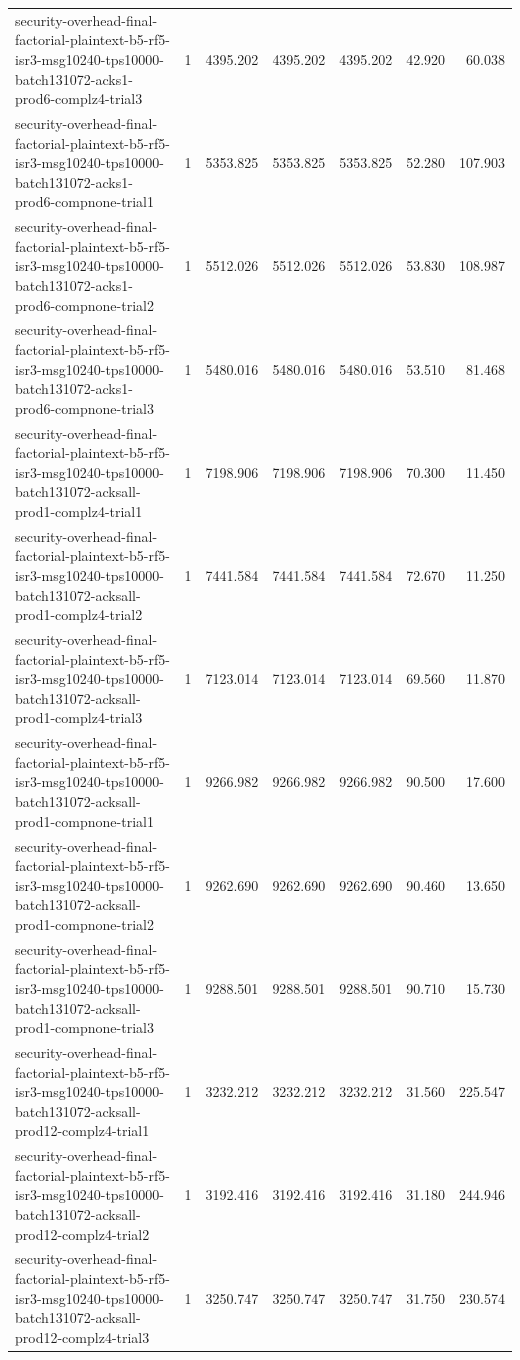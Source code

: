 \begin{tabular}{lrrrrrr}
security-overhead-final-factorial-plaintext-b5-rf5-isr3-msg10240-tps10000-batch131072-acks1-prod6-complz4-trial3 & 1 & 4395.202 & 4395.202 & 4395.202 & 42.920 & 60.038 \\
security-overhead-final-factorial-plaintext-b5-rf5-isr3-msg10240-tps10000-batch131072-acks1-prod6-compnone-trial1 & 1 & 5353.825 & 5353.825 & 5353.825 & 52.280 & 107.903 \\
security-overhead-final-factorial-plaintext-b5-rf5-isr3-msg10240-tps10000-batch131072-acks1-prod6-compnone-trial2 & 1 & 5512.026 & 5512.026 & 5512.026 & 53.830 & 108.987 \\
security-overhead-final-factorial-plaintext-b5-rf5-isr3-msg10240-tps10000-batch131072-acks1-prod6-compnone-trial3 & 1 & 5480.016 & 5480.016 & 5480.016 & 53.510 & 81.468 \\
security-overhead-final-factorial-plaintext-b5-rf5-isr3-msg10240-tps10000-batch131072-acksall-prod1-complz4-trial1 & 1 & 7198.906 & 7198.906 & 7198.906 & 70.300 & 11.450 \\
security-overhead-final-factorial-plaintext-b5-rf5-isr3-msg10240-tps10000-batch131072-acksall-prod1-complz4-trial2 & 1 & 7441.584 & 7441.584 & 7441.584 & 72.670 & 11.250 \\
security-overhead-final-factorial-plaintext-b5-rf5-isr3-msg10240-tps10000-batch131072-acksall-prod1-complz4-trial3 & 1 & 7123.014 & 7123.014 & 7123.014 & 69.560 & 11.870 \\
security-overhead-final-factorial-plaintext-b5-rf5-isr3-msg10240-tps10000-batch131072-acksall-prod1-compnone-trial1 & 1 & 9266.982 & 9266.982 & 9266.982 & 90.500 & 17.600 \\
security-overhead-final-factorial-plaintext-b5-rf5-isr3-msg10240-tps10000-batch131072-acksall-prod1-compnone-trial2 & 1 & 9262.690 & 9262.690 & 9262.690 & 90.460 & 13.650 \\
security-overhead-final-factorial-plaintext-b5-rf5-isr3-msg10240-tps10000-batch131072-acksall-prod1-compnone-trial3 & 1 & 9288.501 & 9288.501 & 9288.501 & 90.710 & 15.730 \\
security-overhead-final-factorial-plaintext-b5-rf5-isr3-msg10240-tps10000-batch131072-acksall-prod12-complz4-trial1 & 1 & 3232.212 & 3232.212 & 3232.212 & 31.560 & 225.547 \\
security-overhead-final-factorial-plaintext-b5-rf5-isr3-msg10240-tps10000-batch131072-acksall-prod12-complz4-trial2 & 1 & 3192.416 & 3192.416 & 3192.416 & 31.180 & 244.946 \\
security-overhead-final-factorial-plaintext-b5-rf5-isr3-msg10240-tps10000-batch131072-acksall-prod12-complz4-trial3 & 1 & 3250.747 & 3250.747 & 3250.747 & 31.750 & 230.574 \\

\end{tabular}
